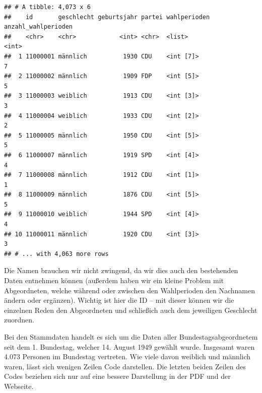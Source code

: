 \documentclass[oneside, 12pt, numbers=endperiod]{scrbook}
\newenvironment{Shaded}{\begin{snugshade}}{\end{snugshade}}
\newcommand{\DataTypeTok}[1]{\textcolor[rgb]{0.13,0.29,0.53}{#1}}
\newcommand{\KeywordTok}[1]{\textcolor[rgb]{0.13,0.29,0.53}{\textbf{#1}}}
\newcommand{\NormalTok}[1]{#1}
\newcommand{\OperatorTok}[1]{\textcolor[rgb]{0.81,0.36,0.00}{\textbf{#1}}}
\newcommand{\OtherTok}[1]{\textcolor[rgb]{0.56,0.35,0.01}{#1}}
\newcommand{\StringTok}[1]{\textcolor[rgb]{0.31,0.60,0.02}{#1}}
\theoremstyle{definition}
\theoremstyle{definition}
\theoremstyle{definition}
\theoremstyle{remark}
\begin{document}
\begin{verbatim}
## # A tibble: 4,073 x 6
##    id       geschlecht geburtsjahr partei wahlperioden anzahl_wahlperioden
##    <chr>    <chr>            <int> <chr>  <list>                     <int>
##  1 11000001 männlich          1930 CDU    <int [7]>                      7
##  2 11000002 männlich          1909 FDP    <int [5]>                      5
##  3 11000003 weiblich          1913 CDU    <int [3]>                      3
##  4 11000004 weiblich          1933 CDU    <int [2]>                      2
##  5 11000005 männlich          1950 CDU    <int [5]>                      5
##  6 11000007 männlich          1919 SPD    <int [4]>                      4
##  7 11000008 männlich          1912 CDU    <int [1]>                      1
##  8 11000009 männlich          1876 CDU    <int [5]>                      5
##  9 11000010 weiblich          1944 SPD    <int [4]>                      4
## 10 11000011 männlich          1920 CDU    <int [3]>                      3
## # ... with 4,063 more rows
\end{verbatim}

Die Namen brauchen wir nicht zwingend, da wir dies auch den bestehenden
Daten entnehmen können (außerdem haben wir ein kleine Problem mit
Abgeordneten, welche während oder zwischen den Wahlperioden den
Nachnamen ändern oder ergänzen). Wichtig ist hier die ID -- mit dieser
können wir die einzelnen Reden den Abgeordneten und schließich auch dem
jeweiligen Geschlecht zuordnen.

Bei den Stammdaten handelt es sich um die Daten aller
Bundestagsabgeordnetem seit dem 1. Bundestag, welcher 14. August 1949
gewählt wurde. Insgesamt waren 4.073 Personen im Bundestag vertreten.
Wie viele davon weiblich und männlich waren, lässt sich wenigen Zeilen
Code darstellen. Die letzten beiden Zeilen des Codes beziehen sich nur
auf eine bessere Darstellung in der PDF und der Webseite.

\begin{Shaded}
\end{Shaded}
\end{document}
